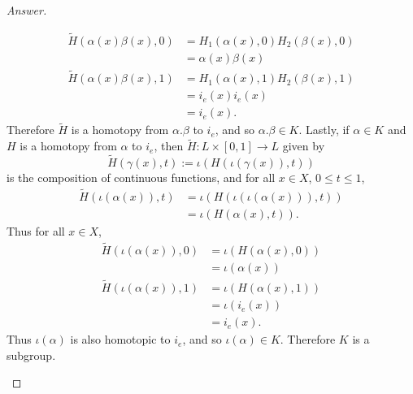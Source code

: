 \documentclass[12pt]{article}
\newcommand\paren[1]{\left( #1 \right)}
\theoremstyle{definition}
\begin{document}
\begin{proof}[Answer]
\begin{enumerate}[(a)]
\begin{align*}
            \tilde{H} \paren{ \alpha(x) \beta(x) , 0 } & = H_1 \paren{ \alpha(x) , 0 } H_2 \paren{ \beta(x) , 0 } \\
            & = \alpha(x) \beta(x) \\
            \tilde{H} \paren{ \alpha(x) \beta(x) , 1 } & = H_1 \paren{ \alpha(x) , 1 } H_2 \paren{ \beta(x) , 1 } \\
            & = i_e(x) i_e(x) \\
            & = i_e(x).
        \end{align*}
        Therefore $\tilde{H}$ is a homotopy from $\alpha.\beta$ to $i_e$, and so $\alpha.\beta \in K$. Lastly, if $\alpha \in K$ and $H$ is a homotopy from $\alpha$ to $i_e$, then $\tilde{H} : L \times [0,1] \to L$ given by
        \[
            \tilde{H} \paren{ \gamma(x) , t } := \iota \paren{ H \paren{ \iota(\gamma(x)) , t } }
        \]
        is the composition of continuous functions, and for all $x \in X$, $0 \leq t \leq 1$,
        \begin{align*}
            \tilde{H} \paren{ \iota(\alpha(x)) , t } & = \iota \paren{ H \paren{ \iota(\iota(\alpha(x))) , t } } \\
            & = \iota \paren{ H \paren{ \alpha(x) , t } }.
        \end{align*}
        Thus for all $x \in X$,
        \begin{align*}
            \tilde{H} \paren{ \iota(\alpha(x)) , 0 } & = \iota \paren{ H \paren{ \alpha(x) , 0 } } \\
            & = \iota\paren{ \alpha(x) } \\
            \tilde{H} \paren{ \iota(\alpha(x)) , 1 } & = \iota \paren{ H \paren{ \alpha(x) , 1 } } \\
            & = \iota \paren{ i_e(x) } \\
            & = i_e(x).
        \end{align*}
        Thus $\iota(\alpha)$ is also homotopic to $i_e$, and so $\iota(\alpha) \in K$. Therefore $K$ is a subgroup.
        

\end{enumerate}
\end{proof}
\end{document}
